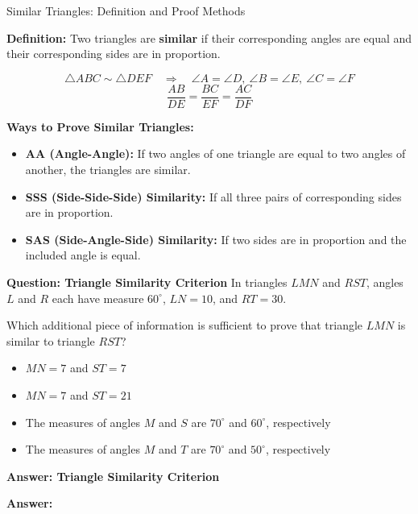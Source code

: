 \documentclass{beamer}
\begin{document}
\begin{frame}{Similar Triangles: Definition and Proof Methods}
\small

\textbf{Definition:}  
Two triangles are \textbf{similar} if their corresponding angles are equal and their corresponding sides are in proportion.

\[
\triangle ABC \sim \triangle DEF \quad \Rightarrow \quad \angle A = \angle D,\ \angle B = \angle E,\ \angle C = \angle F
\]
\[
\frac{AB}{DE} = \frac{BC}{EF} = \frac{AC}{DF}
\]

\vspace{0.3cm}
\textbf{Ways to Prove Similar Triangles:}
\begin{itemize}
    \item \textbf{AA (Angle-Angle):} If two angles of one triangle are equal to two angles of another, the triangles are similar.
    \item \textbf{SSS (Side-Side-Side) Similarity:} If all three pairs of corresponding sides are in proportion.
    \item \textbf{SAS (Side-Angle-Side) Similarity:} If two sides are in proportion and the included angle is equal.
\end{itemize}
\end{frame}


\begin{frame}{\textbf{Question: Triangle Similarity Criterion}}
In triangles \( LMN \) and \( RST \), angles \( L \) and \( R \) each have measure \( 60^\circ \), \( LN = 10 \), and \( RT = 30 \). 

Which additional piece of information is sufficient to prove that triangle \( LMN \) is similar to triangle \( RST \)?

\begin{itemize}
    \item[A.] \( MN = 7 \) and \( ST = 7 \)
    \item[B.] \( MN = 7 \) and \( ST = 21 \)
    \item[C.] The measures of angles \( M \) and \( S \) are \( 70^\circ \) and \( 60^\circ \), respectively
    \item[D.] The measures of angles \( M \) and \( T \) are \( 70^\circ \) and \( 50^\circ \), respectively
\end{itemize}
\end{frame}


\begin{frame}{\textbf{Answer: Triangle Similarity Criterion}}


\textbf{Answer:} 
\end{frame}
\end{document}
